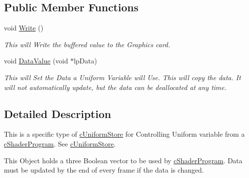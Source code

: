 \subsection*{Public Member Functions}
\begin{DoxyCompactItemize}
\item 
\hypertarget{classc_uniform_boolean_vector3_a719a4289e1bf1a41b4b7c3880acb3f45}{
void \hyperlink{classc_uniform_boolean_vector3_a719a4289e1bf1a41b4b7c3880acb3f45}{Write} ()}
\label{classc_uniform_boolean_vector3_a719a4289e1bf1a41b4b7c3880acb3f45}

\begin{DoxyCompactList}\small\item\em This will Write the buffered value to the Graphics card. \end{DoxyCompactList}\item 
\hypertarget{classc_uniform_boolean_vector3_aaa91a701507c86c58b3e7f5a9cddc4b8}{
void \hyperlink{classc_uniform_boolean_vector3_aaa91a701507c86c58b3e7f5a9cddc4b8}{DataValue} (void $\ast$lpData)}
\label{classc_uniform_boolean_vector3_aaa91a701507c86c58b3e7f5a9cddc4b8}

\begin{DoxyCompactList}\small\item\em This will Set the Data a Uniform Variable will Use. This will copy the data. It will not automatically update, but the data can be deallocated at any time. \end{DoxyCompactList}\end{DoxyCompactItemize}


\subsection{Detailed Description}
This is a specific type of \hyperlink{classc_uniform_store}{cUniformStore} for Controlling Uniform variable from a \hyperlink{classc_shader_program}{cShaderProgram}. See \hyperlink{classc_uniform_store}{cUniformStore}. 

This Object holds a three Boolean vector to be used by \hyperlink{classc_shader_program}{cShaderProgram}. Data must be updated by the end of every frame if the data is changed. 
